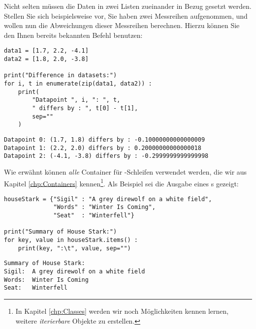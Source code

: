 \begin{hintbox}
Nicht selten müssen die Daten in zwei Listen zueinander in Bezug gesetzt werden. Stellen Sie sich beispielsweise vor, Sie haben zwei Messreihen aufgenommen, und wollen nun die Abweichungen dieser Messreihen berechnen. Hierzu können Sie den Ihnen bereits bekannten Befehl  benutzen:

\begin{codebox}
\begin{verbatim}
data1 = [1.7, 2.2, -4.1]
data2 = [1.8, 2.0, -3.8]

print("Difference in datasets:")
for i, t in enumerate(zip(data1, data2)) :
    print(
        "Datapoint ", i, ": ", t, 
        " differs by : ", t[0] - t[1], 
        sep=""
    )
\end{verbatim}
\end{codebox}

\begin{cmdbox}
\begin{verbatim}
Datapoint 0: (1.7, 1.8) differs by : -0.10000000000000009
Datapoint 1: (2.2, 2.0) differs by : 0.20000000000000018
Datapoint 2: (-4.1, -3.8) differs by : -0.2999999999999998
\end{verbatim}
\end{cmdbox}
\end{hintbox}

Wie erwähnt können \emph{alle} Container für -Schleifen verwendet werden, die wir aus Kapitel \ref{chp:Containers} kennen\footnote{In Kapitel \ref{chp:Classes} werden wir noch Möglichkeiten kennen lernen, weitere \emph{iterierbare} Objekte zu erstellen.}. Als Beispiel sei die Ausgabe eines s gezeigt:
\begin{codebox}
\begin{verbatim}
houseStark = {"Sigil" : "A grey direwolf on a white field",
              "Words" : "Winter Is Coming",
              "Seat"  : "Winterfell"}

print("Summary of House Stark:")
for key, value in houseStark.items() :
    print(key, ":\t", value, sep="")
\end{verbatim}
\end{codebox}

\begin{cmdbox}
\begin{verbatim}
Summary of House Stark:
Sigil:  A grey direwolf on a white field
Words:  Winter Is Coming
Seat:   Winterfell
\end{verbatim}
\end{cmdbox}


